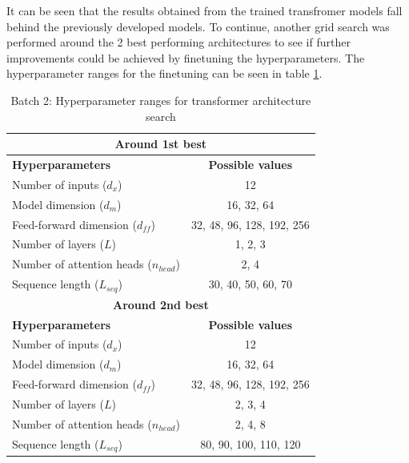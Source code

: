 It can be seen that the results obtained from the trained transfromer models fall behind the previously developed models. To continue, another grid search was performed around the 2 best performing architectures to see if further improvements could be achieved by finetuning the hyperparameters. The hyperparameter ranges for the finetuning can be seen in table \ref{tab:transformer_hyperparams_2}.

\FloatBarrier
\begin{table}[h]
    \centering
    \begin{tabular}{|l|c|}
        \hline
        \multicolumn{2}{|c|}{\textbf{Around 1st best}} \\
        \hline
        \textbf{Hyperparameters} & \textbf{Possible values} \\
        \hline
        Number of inputs ($d_x$) & 12 \\
        \hline
        Model dimension ($d_m$) & 16, 32, 64 \\
        \hline
        Feed-forward dimension ($d_{ff}$) & 32, 48, 96, 128, 192, 256 \\
        \hline
        Number of layers ($L$) & 1, 2, 3 \\
        \hline
        Number of attention heads ($n_{head}$) & 2, 4 \\
        \hline
        Sequence length ($L_{seq}$) & 30, 40, 50, 60, 70 \\
        \hline \hline
        \multicolumn{2}{|c|}{\textbf{Around 2nd best}} \\
        \hline
        \textbf{Hyperparameters} & \textbf{Possible values} \\
        \hline
        Number of inputs ($d_x$) & 12 \\
        \hline
        Model dimension ($d_m$) & 16, 32, 64 \\
        \hline
        Feed-forward dimension ($d_{ff}$) & 32, 48, 96, 128, 192, 256 \\
        \hline
        Number of layers ($L$) & 2, 3, 4 \\
        \hline
        Number of attention heads ($n_{head}$) & 2, 4, 8 \\
        \hline
        Sequence length ($L_{seq}$) & 80, 90, 100, 110, 120 \\
        \hline
    \end{tabular}
    \caption{Batch 2: Hyperparameter ranges for transformer architecture search}
    \label{tab:transformer_hyperparams_2}
\end{table}
\FloatBarrier

